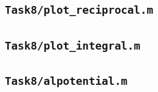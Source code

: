 \subsection{\texttt{Task8/plot\_reciprocal.m}}

\subsection{\texttt{Task8/plot\_integral.m}}

\subsection{\texttt{Task8/alpotential.m}}



